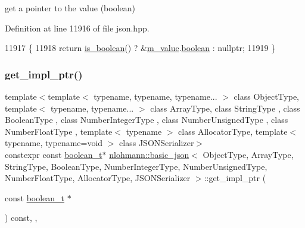 get a pointer to the value (boolean) 



Definition at line 11916 of file json.\+hpp.


\begin{DoxyCode}
11917     \{
11918         \textcolor{keywordflow}{return} \hyperlink{classnlohmann_1_1basic__json_a943e8cb182d0f2365c76d64b42eaa6fd}{is\_boolean}() ? &\hyperlink{classnlohmann_1_1basic__json_aeb0814f76966f99290cb29e127c90a77}{m\_value}.\hyperlink{unionnlohmann_1_1basic__json_1_1json__value_afd0f8ec00c40301efffd01a276959371}{boolean} : \textcolor{keyword}{nullptr};
11919     \}
\end{DoxyCode}
\mbox{\label{classnlohmann_1_1basic__json_ae068eee75c0a814e19208bae641f866c}} 
\subsubsection{\texorpdfstring{get\+\_\+impl\+\_\+ptr()}{get\_impl\_ptr()}\hspace{0.1cm}{\footnotesize\ttfamily [8/14]}}
{\footnotesize\ttfamily template$<$template$<$ typename, typename, typename... $>$ class Object\+Type, template$<$ typename, typename... $>$ class Array\+Type, class String\+Type , class Boolean\+Type , class Number\+Integer\+Type , class Number\+Unsigned\+Type , class Number\+Float\+Type , template$<$ typename $>$ class Allocator\+Type, template$<$ typename, typename=void $>$ class J\+S\+O\+N\+Serializer$>$ \\
constexpr const \hyperlink{classnlohmann_1_1basic__json_a4c919102a9b4fe0d588af64801436082}{boolean\+\_\+t}$\ast$ \hyperlink{classnlohmann_1_1basic__json}{nlohmann\+::basic\+\_\+json}$<$ Object\+Type, Array\+Type, String\+Type, Boolean\+Type, Number\+Integer\+Type, Number\+Unsigned\+Type, Number\+Float\+Type, Allocator\+Type, J\+S\+O\+N\+Serializer $>$\+::get\+\_\+impl\+\_\+ptr (\begin{DoxyParamCaption}\item[{const \hyperlink{classnlohmann_1_1basic__json_a4c919102a9b4fe0d588af64801436082}{boolean\+\_\+t} $\ast$}]{ }\end{DoxyParamCaption}) const\hspace{0.3cm}{\ttfamily [inline]}, {\ttfamily [private]}, {\ttfamily [noexcept]}}



